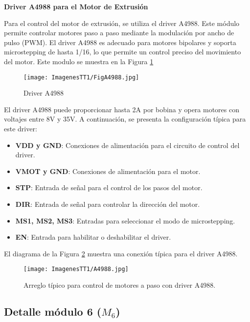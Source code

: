 \documentclass[14pt,oneside]{extarticle} %
\begin{document}
\newpage

\textbf{Driver A4988 para el Motor de Extrusión}

Para el control del motor de extrusión, se utiliza el driver A4988. Este módulo permite controlar motores paso a paso mediante la modulación por ancho de pulso (PWM). El driver A4988 es adecuado para motores bipolares y soporta microstepping de hasta 1/16, lo que permite un control preciso del movimiento del motor. Este modulo se muestra en la Figura \ref{fig:FigA4988}

\begin{figure}[h!]
    \centering
    \texttt{[image: ImagenesTT1/FigA4988.jpg]}
    \caption{Driver A4988}
    \label{fig:FigA4988}
\end{figure}

El driver A4988 puede proporcionar hasta 2A por bobina y opera motores con voltajes entre 8V y 35V. A continuación, se presenta la configuración típica para este driver:

\begin{itemize}
    \item \textbf{VDD y GND}: Conexiones de alimentación para el circuito de control del driver.
    \item \textbf{VMOT y GND}: Conexiones de alimentación para el motor.
    \item \textbf{STP}: Entrada de señal para el control de los pasos del motor.
    \item \textbf{DIR}: Entrada de señal para controlar la dirección del motor.
    \item \textbf{MS1, MS2, MS3}: Entradas para seleccionar el modo de microstepping.
    \item \textbf{EN}: Entrada para habilitar o deshabilitar el driver.
\end{itemize}

\newpage

El diagrama de la Figura \ref{fig:a4988} muestra una conexión típica para el driver A4988.

\begin{figure}[h!]
    \centering
    \texttt{[image: ImagenesTT1/A4988.jpg]}
    \caption{Arreglo típico para control de motores a paso con driver A4988.}
    \label{fig:a4988}
\end{figure}

\subsection{Detalle módulo 6 ($M_6$)}
\end{document}
